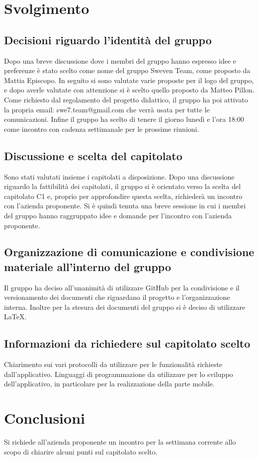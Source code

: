 \documentclass[12pt, a4paper,table]{article}
\begin{document}
	\section{Svolgimento}
		\subsection{Decisioni riguardo l'identità del gruppo}
		Dopo una breve discussione dove i membri del gruppo hanno espresso idee e preferenze è stato scelto come nome del gruppo Sweven Team, come proposto da Mattia Episcopo. In seguito si sono valutate varie proposte per il logo del gruppo, e dopo averle valutate con attenzione si è scelto quello proposto da Matteo Pillon. Come richiesto dal regolamento del progetto didattico, il gruppo ha poi attivato la propria email: swe7.team@gmail.com che verrà usata per tutte le comunicazioni. Infine il gruppo ha scelto di tenere il giorno lunedì e l'ora 18:00 come incontro con cadenza settimanale per le prossime riunioni.
		\subsection{Discussione e scelta del capitolato}
		Sono stati valutati insieme i capitolati a disposizione. Dopo una discussione riguardo la fattibilità dei capitolati, il gruppo si è orientato verso la scelta del capitolato C1 e, proprio per approfondire questa scelta, richiederà un incontro con l'azienda proponente. Si è quindi tenuta una breve sessione in cui i membri del gruppo hanno raggruppato idee e domande per l'incontro con l'azienda proponente.
		\subsection{Organizzazione di comunicazione e condivisione materiale all'interno del gruppo}
		Il gruppo ha deciso all'unanimità di utilizzare GitHub per la condivisione e il versionamento dei documenti che riguardano il progetto e l'organizzazione interna. Inoltre per la stesura dei documenti del gruppo si è deciso di utilizzare \LaTeX .
		\subsection{Informazioni da richiedere sul capitolato scelto}
		Chiarimento sui vari protocolli da utilizzare per le funzionalità richieste dall'applicativo.
		Linguaggi di programmazione da utilizzare per lo sviluppo dell'applicativo, in particolare per la realizzazione della parte mobile.
	\section{Conclusioni}
	Si richiede all'azienda proponente un incontro per la settimana corrente allo scopo di chiarire alcuni punti sul capitolato scelto.
	\newpage
\end{document}
